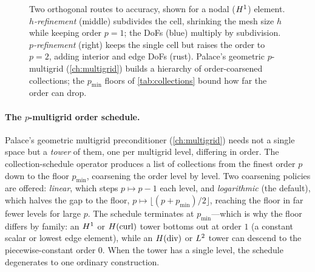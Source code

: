 \begin{figure}[t]
\centering
{}
\caption[$h$- versus $p$-refinement]{Two orthogonal routes to accuracy, shown for a nodal
($H^1$) element. \emph{$h$-refinement} (middle) subdivides the cell, shrinking the mesh size $h$
while keeping order $p=1$; the DoFs (blue) multiply by subdivision. \emph{$p$-refinement} (right)
keeps the single cell but raises the order to $p=2$, adding interior and edge DoFs (rust). Palace's
geometric $p$-multigrid (\cref{ch:multigrid}) builds a hierarchy of order-coarsened collections; the
$p_{\min}$ floors of \cref{tab:collections} bound how far the order can drop.}
\label{fig:hp}
\end{figure}

\paragraph{The $p$-multigrid order schedule.} Palace's geometric multigrid preconditioner
(\cref{ch:multigrid}) needs not a single space but a \emph{tower} of them, one per multigrid level,
differing in order. The collection-schedule operator produces a list of collections from the finest
order $p$ down to the floor $p_{\min}$, coarsening the order level by level. Two coarsening policies
are offered: \emph{linear}, which steps $p \mapsto p-1$ each level, and \emph{logarithmic} (the
default), which halves the gap to the floor, $p \mapsto \lfloor (p+p_{\min})/2 \rfloor$, reaching the
floor in far fewer levels for large $p$. The schedule terminates at $p_{\min}$---which is why the
floor differs by family: an $H^1$ or $H(\mathrm{curl})$ tower bottoms out at order $1$ (a constant scalar or
lowest edge element), while an $H(\mathrm{div})$ or $L^2$ tower can descend to the piecewise-constant order
$0$. When the tower has a single level, the schedule degenerates to one ordinary 
construction.

